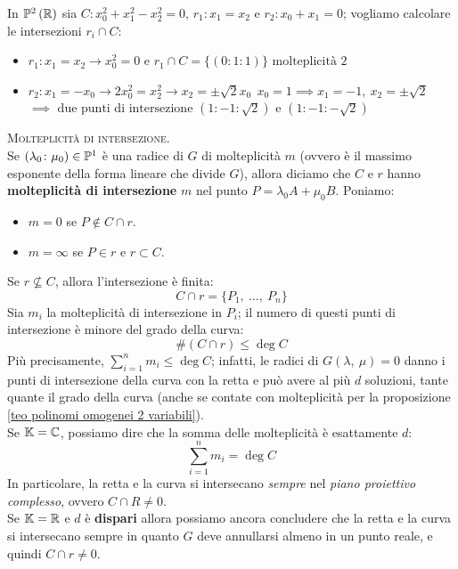 \begin{example}
	In $\proj[2]{\realset}$ sia $C\colon x_0^2+x_1^2-x_2^2=0$, $r_1\colon x_1=x_2$ e $r_2\colon x_0+x_1=0$; vogliamo calcolare le intersezioni $r_i\cap C$:
	\begin{itemize}
		\item $r_1\colon x_1=x_2 \rightarrow x_0^2=0 \text{ e } r_1\cap C=\{ (0\colon 1 \colon 1) \} \text{ molteplicità 2}$
		\item $r_2 \colon x_1=-x_0 \rightarrow 2x_0^2=x_2^2 \rightarrow x_2=\pm \sqrt{2}x_0 \ \ x_0=1\implies x_1=-1,\ x_2=\pm \sqrt{2}$\\
			$\implies \text{ due punti di intersezione } (1\colon -1\colon \sqrt{2}) \text{ e } (1\colon -1\colon -\sqrt{2})$
	\end{itemize}
\end{example}
\begin{define}\textsc{Molteplicità di intersezione}.\\
	Se $(\lambda_0\colon\mu_0)\in\proj[1]{\ }$ è una radice di $G$ di molteplicità $m$ (ovvero è il massimo esponente della forma lineare che divide $G$), allora diciamo che $C$ e $r$ hanno \textbf{molteplicità di intersezione} $m$ nel punto $P=\lambda_0 A+\mu_0 B$. Poniamo:
	\begin{itemize}
		\item $m=0$ se $P\notin C\cap r$.
		\item $m=\infty$ se $P\in r$ e $r\subset C$.
	\end{itemize} 
\end{define}
\begin{observe}
	Se $r\nsubseteq C$, allora l'intersezione è finita:
	\begin{equation*}
		C\cap r=\{P_1,\ \ldots,\ P_n\}
	\end{equation*}
	Sia $m_i$ la molteplicità di intersezione in $P_i$; il numero di questi punti di intersezione è minore del grado della curva:
		\begin{equation}
			\# (C\cap r)\leq \deg C
		\end{equation}
	Più precisamente, $\displaystyle \sum_{i=1}^n m_i\leq\deg C$; infatti, le radici di $G\left(\lambda,\ \mu\right)=0$ danno i punti di intersezione della curva con la retta e può avere al più $d$ soluzioni, tante quante il grado della curva (anche se contate con molteplicità per la proposizione \ref{teo polinomi omogenei 2 variabili}).\\
	Se $\mathbb{K}=\mathbb{C}$, possiamo dire che la somma delle molteplicità è esattamente $d$:
	\begin{equation}
		\displaystyle \sum_{i=1}^n m_i=\deg C
	\end{equation}
	In particolare, la retta e la curva si intersecano \textit{sempre} nel \textit{piano proiettivo complesso}, ovvero $C\cap R\neq 0$.\\
	Se $\mathbb{K}=\mathbb{R}$ e $d$ è \textbf{dispari} allora possiamo ancora concludere che la retta e la curva si intersecano sempre in quanto $G$ deve annullarsi almeno in un punto reale, e quindi $C\cap r\neq 0$.
\end{observe}
